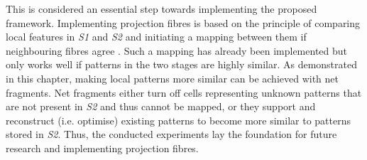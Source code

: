 This is considered an essential step towards implementing the proposed framework.
Implementing projection fibres  is based on the principle of comparing local features in \emph{S1} and \emph{S2} and initiating a mapping between them if neighbouring fibres agree .
Such a mapping has already been implemented  but only works well if patterns in the two stages are highly similar.
As demonstrated in this chapter, making local patterns more similar can be achieved with net fragments. Net fragments either turn off cells representing unknown patterns that are not present in \emph{S2} and thus cannot be mapped, or they support and reconstruct (i.e. optimise) existing patterns to become more similar to patterns stored in \emph{S2}.
Thus, the conducted experiments lay the foundation for future research and implementing projection fibres.
